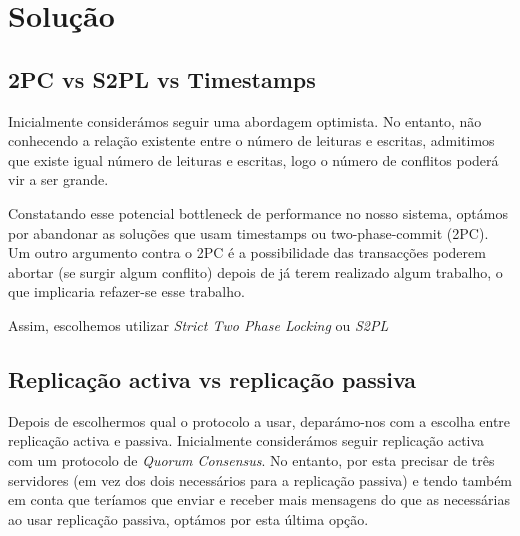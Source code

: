 \section{Solução}

\subsection{2PC vs S2PL vs Timestamps}

Inicialmente considerámos seguir uma abordagem optimista. No entanto, não conhecendo a relação existente entre o número de leituras e escritas, admitimos que existe igual número de leituras e escritas, logo o número de conflitos poderá vir a ser grande. 

Constatando esse potencial bottleneck de performance no nosso sistema, optámos por abandonar as soluções que usam timestamps ou two-phase-commit (2PC). Um outro argumento contra o 2PC é a possibilidade das transacções poderem abortar (se surgir algum conflito) depois de já terem realizado algum trabalho, o que implicaria refazer-se esse trabalho.

Assim, escolhemos utilizar \textit{Strict Two Phase Locking} ou \textit{S2PL}

\subsection{Replicação activa vs replicação passiva}

Depois de escolhermos qual o protocolo a usar, deparámo-nos com a escolha entre replicação activa e passiva. Inicialmente considerámos seguir replicação activa com um protocolo de \textit{Quorum Consensus}. No entanto, por esta precisar de três servidores (em vez dos dois necessários para a replicação passiva) e tendo também em conta que teríamos que enviar e receber mais mensagens do que as necessárias ao usar replicação passiva, optámos por esta última opção.
